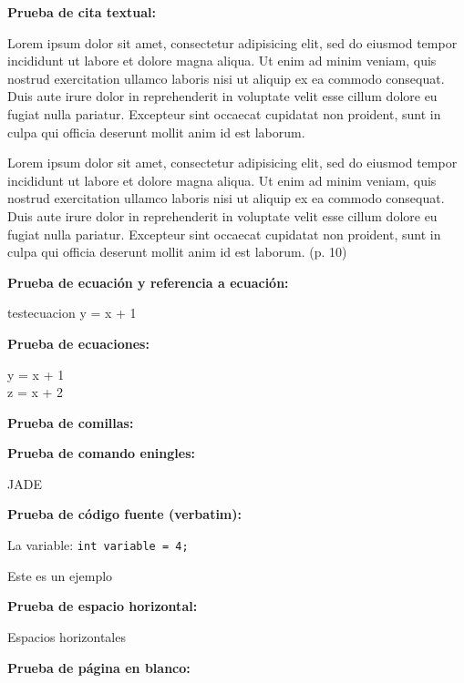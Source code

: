\documentclass{uclamsc}
\begin{document}
\begin{contenido}
\espaciodoble\textbf{Prueba de cita textual:}

Lorem ipsum dolor sit amet, consectetur adipisicing elit, sed do eiusmod tempor incididunt ut labore et dolore magna aliqua. Ut enim ad minim veniam, quis nostrud exercitation ullamco laboris nisi ut aliquip ex ea commodo consequat. Duis aute irure dolor in reprehenderit in voluptate velit esse cillum dolore eu fugiat nulla pariatur. Excepteur sint occaecat cupidatat non proident, sunt in culpa qui officia deserunt mollit anim id est laborum.

\begin{citatextual}
Lorem ipsum dolor sit amet, consectetur adipisicing elit, sed do eiusmod tempor incididunt ut labore et dolore magna aliqua. Ut enim ad minim veniam, quis nostrud exercitation ullamco laboris nisi ut aliquip ex ea commodo consequat. Duis aute irure dolor in reprehenderit in voluptate velit esse cillum dolore eu fugiat nulla pariatur. Excepteur sint occaecat cupidatat non proident, sunt in culpa qui officia deserunt mollit anim id est laborum.
(p. 10)
\end{citatextual}

\espaciodoble\textbf{Prueba de ecuación y referencia a ecuación:}


\begin{ecuacion}{testecuacion}
	y = x + 1
\end{ecuacion}

\espaciodoble\textbf{Prueba de ecuaciones:}

\begin{ecuaciones}
	y = x + 1 \\
	z = x + 2
\end{ecuaciones}

\espaciodoble\textbf{Prueba de comillas:}


\espaciodoble\textbf{Prueba de comando eningles:}

JADE 

\espaciodoble\textbf{Prueba de código fuente (verbatim):}

La variable: \verb|int variable = 4;|

Este es un ejemplo

\espaciodoble\textbf{Prueba de espacio horizontal:}

Espacios  horizontales

\espaciodoble\textbf{Prueba de página en blanco:}
\pagenblanco

\end{contenido}

\hacerbibliografia
\end{document}
